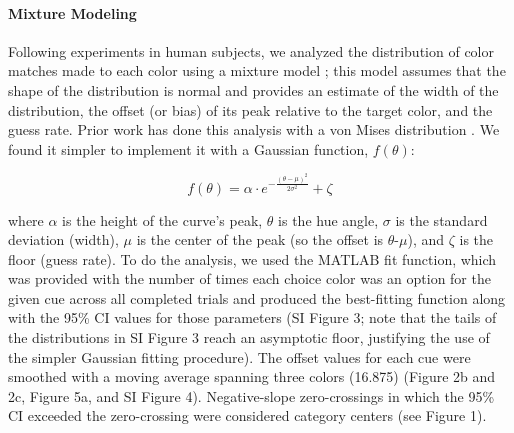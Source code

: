 \documentclass[9pt,biorxiv,lineno,onehalfspacing]{lapreprint}
\begin{document}
\begin{refsection}
\paragraph{Mixture Modeling}\label{para:MixtureModeling}

Following experiments in human subjects, we analyzed the distribution of color matches made to each color using a mixture model \citep{zhang_discrete_2008,bae_why_2015}; this model assumes that the shape of the distribution is normal and provides an estimate of the width of the distribution, the offset (or bias) of its peak relative to the target color, and the guess rate.
Prior work has done this analysis with a von Mises distribution \citep{zhang_discrete_2008,bae_why_2015}.
We found it simpler to implement it with a Gaussian function, $f(\theta)$:



\begin{equation} \label{eq:GaussianEquation}
    f(\theta) = {\alpha} \cdot e^{-\frac{(\theta-{\mu})^2}{2{\sigma}^2}} + {\zeta}        
\end{equation}



where $\alpha$ is the height of the curve's peak, $\theta$ is the hue angle, $\sigma$ is the standard deviation (width), $\mu$ is the center of the peak (so the offset is $\theta$-$\mu$), and $\zeta$ is the floor (guess rate). 
To do the analysis, we used the MATLAB fit function, which was provided with the number of times each choice color was an option for the given cue across all completed trials and produced the best-fitting function along with the 95\% CI values for those parameters (SI Figure 3; note that the tails of the distributions in SI Figure 3 reach an asymptotic floor, justifying the use of the simpler Gaussian fitting procedure). 
The offset values for each cue were smoothed with a moving average spanning three colors (16.875\degree{}) (Figure 2b and 2c, Figure 5a, and SI Figure 4). Negative-slope zero-crossings in which the 95\% CI exceeded the zero-crossing were considered category centers (see Figure 1).


\end{refsection}
\end{document}

